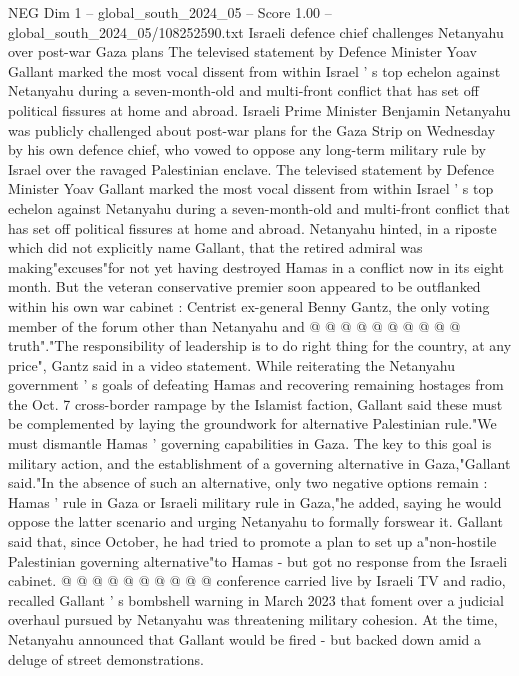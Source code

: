 \begin{textsample}{NEG Dim 1 – global\_south\_2024\_05 – Score 1.00 – global\_south\_2024\_05/108252590.txt}  \label{ex:f1_neg_376}
Israeli defence chief challenges Netanyahu over post-war Gaza plans The televised statement by Defence Minister Yoav Gallant marked the most vocal dissent from within Israel ' s top echelon against Netanyahu during a seven-month-old and multi-front conflict that has set off political fissures at home and abroad.
Israeli Prime Minister Benjamin Netanyahu was publicly challenged about post-war plans for the Gaza Strip on Wednesday by his own defence chief, who vowed to oppose any long-term military rule by Israel over the ravaged Palestinian enclave.
The televised statement by Defence Minister Yoav Gallant marked the most vocal dissent from within Israel ' s top echelon against Netanyahu during a seven-month-old and multi-front conflict that has set off political fissures at home and abroad.
Netanyahu hinted, in a riposte which did not explicitly name Gallant, that the retired admiral was making"excuses"for not yet having destroyed Hamas in a conflict now in its eight month.
But the veteran conservative premier soon appeared to be outflanked within his own war cabinet : Centrist ex-general Benny Gantz, the only voting member of the forum other than Netanyahu and @ @ @ @ @ @ @ @ @ @ truth"."The responsibility of leadership is to do right thing for the country, at any price", Gantz said in a video statement.
While reiterating the Netanyahu government ' s goals of defeating Hamas and recovering remaining hostages from the Oct. 7 cross-border rampage by the Islamist faction, Gallant said these must be complemented by laying the groundwork for alternative Palestinian rule."We must dismantle Hamas ' governing capabilities in Gaza.
The key to this goal is military action, and the establishment of a governing alternative in Gaza,"Gallant said."In the absence of such an alternative, only two negative options remain : Hamas ' rule in Gaza or Israeli military rule in Gaza,"he added, saying he would oppose the latter scenario and urging Netanyahu to formally forswear it.
Gallant said that, since October, he had tried to promote a plan to set up a"non-hostile Palestinian governing alternative"to Hamas - but got no response from the Israeli cabinet. @ @ @ @ @ @ @ @ @ @ conference carried live by Israeli TV and radio, recalled Gallant ' s bombshell warning in March 2023 that foment over a judicial overhaul pursued by Netanyahu was threatening military cohesion.
At the time, Netanyahu announced that Gallant would be fired - but backed down amid a deluge of street demonstrations.

\end{textsample}
